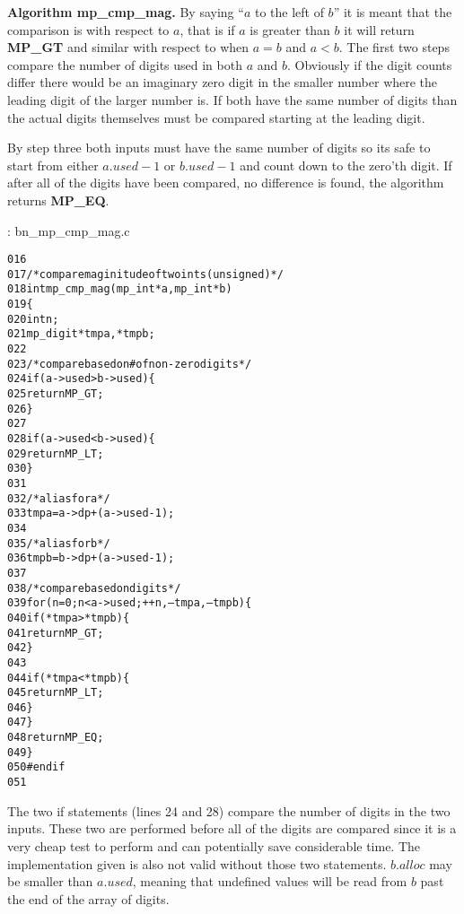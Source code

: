 \documentclass[b5paper]{book}
\begin{document}
\textbf{Algorithm mp\_cmp\_mag.}
By saying ``$a$ to the left of $b$'' it is meant that the comparison is with respect to $a$, that is if $a$ is greater than $b$ it will return
\textbf{MP\_GT} and similar with respect to when $a = b$ and $a < b$.  The first two steps compare the number of digits used in both $a$ and $b$.  
Obviously if the digit counts differ there would be an imaginary zero digit in the smaller number where the leading digit of the larger number is.  
If both have the same number of digits than the actual digits themselves must be compared starting at the leading digit.  

By step three both inputs must have the same number of digits so its safe to start from either $a.used - 1$ or $b.used - 1$ and count down to
the zero'th digit.  If after all of the digits have been compared, no difference is found, the algorithm returns \textbf{MP\_EQ}.

\vspace{+3mm}\begin{small}
\hspace{-5.1mm}{\bf File}: bn\_mp\_cmp\_mag.c
\vspace{-3mm}
\begin{alltt}
016   
017   /* compare maginitude of two ints (unsigned) */
018   int mp_cmp_mag (mp_int * a, mp_int * b)
019   \{
020     int     n;
021     mp_digit *tmpa, *tmpb;
022   
023     /* compare based on # of non-zero digits */
024     if (a->used > b->used) \{
025       return MP_GT;
026     \}
027     
028     if (a->used < b->used) \{
029       return MP_LT;
030     \}
031   
032     /* alias for a */
033     tmpa = a->dp + (a->used - 1);
034   
035     /* alias for b */
036     tmpb = b->dp + (a->used - 1);
037   
038     /* compare based on digits  */
039     for (n = 0; n < a->used; ++n, --tmpa, --tmpb) \{
040       if (*tmpa > *tmpb) \{
041         return MP_GT;
042       \}
043   
044       if (*tmpa < *tmpb) \{
045         return MP_LT;
046       \}
047     \}
048     return MP_EQ;
049   \}
050   #endif
051   
\end{alltt}
\end{small}

The two if statements (lines 24 and 28) compare the number of digits in the two inputs.  These two are 
performed before all of the digits are compared since it is a very cheap test to perform and can potentially save 
considerable time.  The implementation given is also not valid without those two statements.  $b.alloc$ may be 
smaller than $a.used$, meaning that undefined values will be read from $b$ past the end of the array of digits.
\end{document}
